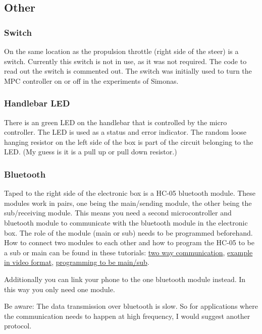 \subsection{Other}
\subsubsection{Switch}
On the same location as the propulsion throttle (right side of the steer) is a switch.
Currently this switch is not in use, as it was not required.
The code to read out the switch is commented out.
The switch was initially used to turn the MPC controller on or off in the experiments of Simonas.

\subsubsection{Handlebar LED}
There is an green LED on the handlebar that is controlled by the micro controller.
The LED is used as a status and error indicator.
The random loose hanging resistor on the left side of the box is part of the circuit belonging to the LED. (My guess is it is a pull up or pull down resistor.)

\subsubsection{Bluetooth}
Taped to the right side of the electronic box is a HC-05 bluetooth module.
These modules work in pairs, one being the main/sending module, the other being the sub/receiving module.
This means you need a second microcontroller and bluetooth module to communicate with the bluetooth module in the electronic box.
The role of the module (main or sub) needs to be programmed beforehand.
How to connect two modules to each other and how to program the HC-05 to be a sub or main can be found in these tutorials: 
\href{https://www.instructables.com/Arduino-Two-Way-Communication-Via-Bluetooth-HC-05/}{two way communication}, \href{https://www.youtube.com/watch?v=hyME1osgr7s}{example in video format}, \href{https://www.instructables.com/AT-command-mode-of-HC-05-Bluetooth-module/}{programming to be main/sub}.

Additionally you can link your phone to the one bluetooth module instead. In this way you only need one module.

Be aware: The data transmission over bluetooth is slow. So for applications where the communication needs to happen at high frequency, I would suggest another protocol.

